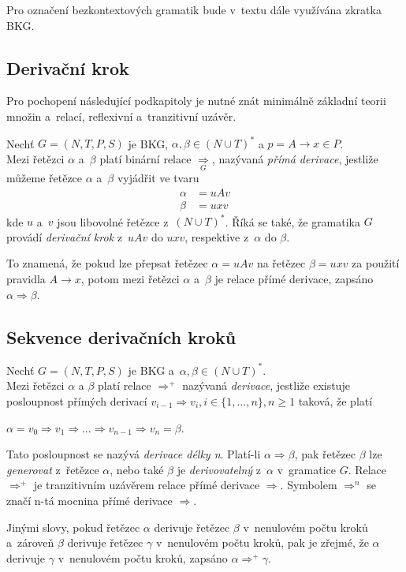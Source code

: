 \begin{convention}
    Pro označení bezkontextových gramatik bude v~textu dále využívána zkratka BKG.
\end{convention}

\subsection*{Derivační krok}\label{kap_der_krok}
Pro pochopení následující podkapitoly je nutné znát minimálně základní teorii množin a~relací, reflexivní a~tranzitivní uzávěr.
\begin{definition}\label{def_derivacni_krok}
    Nechť $G = (N, T, P, S)$ je BKG, $\alpha, \beta  \in (N \cup T)^*$ a $p = A \rightarrow x \in P$. \\
    Mezi řetězci $\alpha$ a~$\beta$ platí binární relace $\underset{G}{\Rightarrow}$, nazývaná \emph{přímá derivace}, jestliže můžeme řetězce $\alpha$ a~$\beta$ vyjádřit ve tvaru
    \begin{align*}
        \alpha &= uAv\\
        \beta &= uxv
    \end{align*}
    kde $u$ a~$v$ jsou libovolné řetězce z~$(N \cup T)^*$. 
    Říká se také, že gramatika $G$ provádí \emph{derivační krok} z~$uAv$ do $uxv$, respektive z~$\alpha$ do $\beta$.
\end{definition}
To znamená, že pokud lze přepsat řetězec $\alpha = uAv$ na řetězec $\beta = uxv$ za použití pravidla $A \rightarrow x$, potom mezi řetězci $\alpha$ a~$\beta$ je relace přímé derivace, zapsáno $\alpha \Rightarrow \beta$.

\subsection*{Sekvence derivačních kroků}\label{kap_sekvence_der_kroku}
\begin{definition}\label{ref_tranz_uzaver}
    Nechť $G = (N, T, P, S)$ je BKG a~$\alpha, \beta \in (N \cup T)^*$. \\
    Mezi řetězci $\alpha$ a $\beta$ platí relace $\Rightarrow^+$ nazývaná \emph{derivace}, jestliže existuje posloupnost přímých derivací $v_{i-1} \Rightarrow v_i, i \in \{1, \ldots, n\}, n \geq 1$ taková, že platí
    \begin{center}
        $\alpha = v_0 \Rightarrow v_1 \Rightarrow \ldots \Rightarrow v_{n-1} \Rightarrow v_n = \beta$.
    \end{center}
    Tato posloupnost se nazývá \emph{derivace délky n}.
    Platí-li $\alpha \Rightarrow \beta$, pak řetězec $\beta$ lze \emph{generovat} z~řetězce $\alpha$, nebo také $\beta$ je \emph{derivovatelný} z~$\alpha$ v~gramatice $G$.
    Relace $\Rightarrow^+$ je tranzitivním uzávěrem relace přímé derivace $\Rightarrow$.
    Symbolem $\Rightarrow^n$ se značí n-tá mocnina přímé derivace $\Rightarrow$.
\end{definition}
Jinými slovy, pokud řetězec $\alpha$ derivuje řetězec $\beta$ v~nenulovém počtu kroků a~zároveň $\beta$ derivuje řetězec $\gamma$ v~nenulovém počtu kroků, pak je zřejmé, že $\alpha$ derivuje $\gamma$ v~nenulovém počtu kroků, zapsáno $\alpha \Rightarrow^+ \gamma$. 

